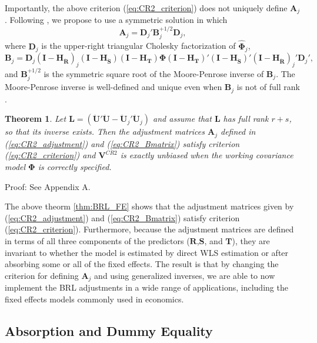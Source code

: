 \documentclass[12pt]{article}
\newtheorem{thm}{Theorem}
\newcommand{\bm}{\mathbf}
\newcommand{\bs}{\boldsymbol}
\begin{document}
Importantly, the above criterion (\ref{eq:CR2_criterion}) does not uniquely define $\bm{A}_j$. Following \citet{McCaffrey2001generalizations}, we propose to use a symmetric solution in which
\begin{equation}
\label{eq:CR2_adjustment}
\bm{A}_j = \bm{D}_j' \bm{B}_j^{+1/2} \bm{D}_j,
\end{equation}
where $\bm{D}_j$ is the upper-right triangular Cholesky factorization of $\hat{\bs\Phi}_j$, 
\begin{equation}
\label{eq:CR2_Bmatrix}
\bm{B}_j = \bm{D}_j\left(\bm{I} - \bm{H_{\ddot{R}}}\right)_j \left(\bm{I} - \bm{H_{\ddot{S}}}\right) \left(\bm{I} - \bm{H_T}\right) \bs\Phi \left(\bm{I} - \bm{H_T}\right)' \left(\bm{I} - \bm{H_{\ddot{S}}}\right)' \left(\bm{I} - \bm{H_{\ddot{R}}}\right)_j' \bm{D}_j',
\end{equation}
and $\bm{B}_j^{+1/2}$ is the symmetric square root of the Moore-Penrose inverse of $\bm{B}_j $. 
The Moore-Penrose inverse is well-defined and unique even when $\bm{B}_j$ is not of full rank \citep[][Thm. 9.18]{Banerjee2014linear}.

\begin{thm}
\label{thm:BRL_FE_intext}
Let $\bm{L} = \left(\bm{\ddot{U}}'\bm{\ddot{U}} - \bm{\ddot{U}}_j'\bm{\ddot{U}}_j\right)$ and assume that $\bm{L}$ has full rank $r + s$, so that its inverse exists. Then the adjustment matrices $\bm{A}_j$ defined in (\ref{eq:CR2_adjustment}) and (\ref{eq:CR2_Bmatrix}) satisfy criterion (\ref{eq:CR2_criterion}) and $\bm{V}^{CR2}$ is exactly unbiased when the working covariance model $\bs\Phi$ is correctly specified.
\end{thm}
Proof: See Appendix A.

The above theorm \ref{thm:BRL_FE} shows that the adjustment matrices given by (\ref{eq:CR2_adjustment}) and (\ref{eq:CR2_Bmatrix}) satisfy criterion (\ref{eq:CR2_criterion}). Furthermore, because the adjustment matrices are defined in terms of all three components of the predictors ($\bm{R}$,$\bm{S}$, and $\bm{T}$), they are invariant to whether the model is estimated by direct WLS estimation or after absorbing some or all of the fixed effects. 
The result is that by changing the criterion for defining $\bm{A}_j$ and using generalized inverses, we are able to now implement the BRL adjustments in a wide range of applications, including the fixed effects models commonly used in economics.

\subsection{Absorption and Dummy Equality}
\end{document}
